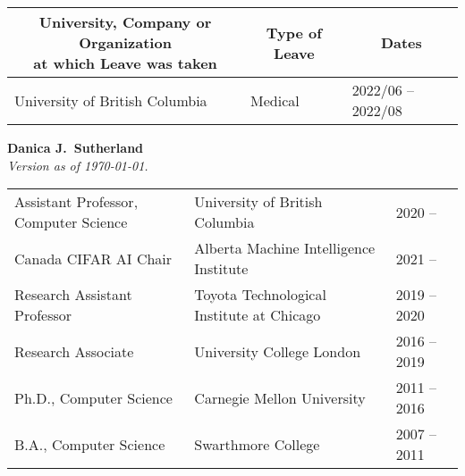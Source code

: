 \documentclass[10pt]{article}
\begin{document}
{%
%

{%
  \noindent\vspace{-2em}
  \begin{table}[h!]
    \begin{tabular}{ p{} p{} p{} }
      \toprule
      \multicolumn{1}{c}{\parbox[c][][c]{0.45\textwidth}{\centering\bf University, Company or Organization \\ at which Leave was taken}} &
      \multicolumn{1}{c}{\bf Type of Leave}
      & \multicolumn{1}{c}{\bf Dates} \\
      \midrule
      University of British Columbia &  Medical & 2022/06 -- 2022/08 \\
      \bottomrule
    \end{tabular}
  \end{table}

  \clearpage
}%

}{
    \begin{center}
    \textbf{\Large Danica J.\ Sutherland}
    \\
    \footnotesize{\textit{Version as of \today.}}
    \end{center}

\begin{table}[h!]
  \begin{tabular}{ p{} p{} p{} }
    \toprule
    Assistant Professor, Computer Science & University of British Columbia  & 2020 --         \\
    Canada CIFAR AI Chair & Alberta Machine Intelligence Institute & 2021 --  \\
    \midrule
    Research Assistant Professor & Toyota Technological Institute at Chicago & 2019 -- 2020 \\
    Research Associate & University College London & 2016 -- 2019 \\
    Ph.D., Computer Science & Carnegie Mellon University & 2011 -- 2016 \\
    B.A., Computer Science & Swarthmore College & 2007 -- 2011 \\
    \bottomrule
  \end{tabular}
\end{table}
}
\end{document}
